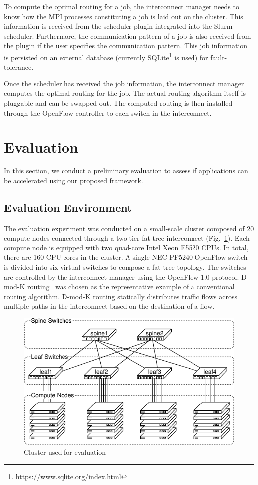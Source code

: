 \documentclass[graybox]{svmult}
\begin{document}
To compute the optimal routing for a job, the interconnect manager needs to
know how the MPI processes constituting a job is laid out on the cluster.
This information is received from the scheduler plugin integrated into the
Slurm scheduler. Furthermore, the communication pattern of a job is also
received from the plugin if the user specifies the communication pattern.
This job information is persisted on an external database (currently
SQLite\footnote{\url{https://www.sqlite.org/index.html}} is used) for
fault-tolerance.

Once the scheduler has received the job information, the interconnect manager
computes the optimal routing for the job. The actual routing algorithm itself
is pluggable and can be swapped out. The computed routing is then installed
through the OpenFlow controller to each switch in the interconnect.

\section{Evaluation}\label{kt:sec:iv}

In this section, we conduct a preliminary evaluation to assess if applications
can be accelerated using our proposed framework.

\subsection{Evaluation Environment}

The evaluation experiment was conducted on a small-scale cluster composed of
20 compute nodes connected through a two-tier fat-tree interconnect
(Fig.~\ref{kt:fig:cluster}). Each compute node is equipped with two quad-core
Intel Xeon E5520 CPUs. In total, there are 160 CPU cores in the cluster. A
single NEC PF5240 OpenFlow switch is divided into six virtual switches to
compose a fat-tree topology. The switches are controlled by the interconnect
manager using the OpenFlow 1.0 protocol. D-mod-K routing~\cite{Rodriguez2009}
was chosen as the representative example of a conventional routing algorithm.
D-mod-K routing statically distributes traffic flows across multiple paths in
the interconnect based on the destination of a flow.

\begin{figure}
    \centering
    \includegraphics{evaluation_cluster}
    \caption{Cluster used for evaluation}%
    \label{kt:fig:cluster}
\end{figure}
\end{document}
